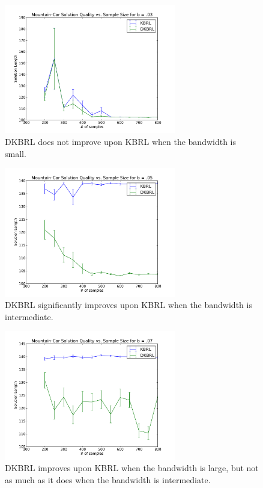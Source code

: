 \begin{figure}[!!!ht]
  \centering
    \includegraphics[width=75mm]{figs/chap5/mc03.pdf}
  \caption[KBRL vs. DKBRL with small bandwidth on Mountain-Car]
{DKBRL does not improve upon KBRL when the bandwidth is small.}
\end{figure}
\begin{figure}[!!!ht]
  \centering
    \includegraphics[width=75mm]{figs/chap5/mc05.pdf}
  \caption[KBRL vs. DKBRL with itermediate bandwidth on Mountain-Car]
  {DKBRL significantly improves upon KBRL when the bandwidth is
intermediate.}
\end{figure}
\begin{figure}[!!!ht]
  \centering
    \includegraphics[width=75mm]{figs/chap5/mc07.pdf}
  \caption[KBRL vs. DKBRL with large bandwidth on Mountain-Car]
{DKBRL improves upon KBRL when the bandwidth is large, but not as
much as it does when the bandwidth is intermediate.}
\end{figure}

